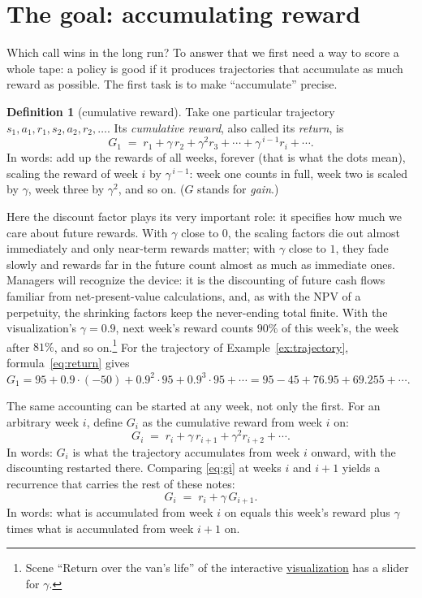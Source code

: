 \documentclass[11pt,a4paper]{article}
\theoremstyle{definition}
\newtheorem{definition}{Definition}[section]
\theoremstyle{remark}
\numberwithin{equation}{section}
\newcommand{\vizhref}[1]{\href{https://sml-fs26.github.io/classic_rl/repair-or-replace/}{#1}}
\begin{document}
\section{The goal: accumulating reward}

Which call wins in the long run? To answer that we first need a way to score a whole tape: a
policy is good if it produces trajectories that accumulate as much reward as possible. The
first task is to make ``accumulate'' precise.

\begin{definition}[cumulative reward]
Take one particular trajectory $s_1, a_1, r_1, s_2, a_2, r_2, \dots$. Its \emph{cumulative
reward}, also called its \emph{return}, is
\begin{equation}\label{eq:return}
G_1 \;=\; r_1 + \gamma\, r_2 + \gamma^2 r_3 + \cdots + \gamma^{\,i-1} r_i + \cdots.
\end{equation}
In words: add up the rewards of all weeks, forever (that is what the dots mean), scaling the
reward of week $i$ by $\gamma^{\,i-1}$: week one counts in full, week two is scaled by
$\gamma$, week three by $\gamma^2$, and so on. ($G$ stands for \emph{gain}.)
\end{definition}

Here the discount factor plays its very important role: it specifies how much we care about
future rewards. With $\gamma$ close to $0$, the scaling factors die out almost immediately
and only near-term rewards matter; with $\gamma$ close to $1$, they fade slowly and rewards
far in the future count almost as much as immediate ones. Managers will recognize the device:
it is the discounting of future cash flows familiar from net-present-value calculations, and,
as with the NPV of a perpetuity, the shrinking factors keep the never-ending total finite.
With the visualization's $\gamma = 0.9$, next week's reward counts $90\%$ of this week's, the
week after $81\%$, and so on.\footnote{Scene ``Return over the van's life'' of the
interactive \vizhref{visualization} has a slider for $\gamma$.} For the trajectory of
Example~\ref{ex:trajectory}, formula~\eqref{eq:return} gives
$G_1 = 95 + 0.9 \cdot (-50) + 0.9^2 \cdot 95 + 0.9^3 \cdot 95 + \cdots
= 95 - 45 + 76.95 + 69.255 + \cdots$.

The same accounting can be started at any week, not only the first. For an arbitrary week
$i$, define $G_i$ as the cumulative reward from week $i$ on:
\begin{equation}\label{eq:gi}
G_i \;=\; r_i + \gamma\, r_{i+1} + \gamma^2 r_{i+2} + \cdots.
\end{equation}
In words: $G_i$ is what the trajectory accumulates from week $i$ onward, with the discounting
restarted there. Comparing \eqref{eq:gi} at weeks $i$ and $i+1$ yields a recurrence that
carries the rest of these notes:
\begin{equation}\label{eq:recurrence}
G_i \;=\; r_i + \gamma\, G_{i+1}.
\end{equation}
In words: what is accumulated from week $i$ on equals this week's reward plus $\gamma$ times
what is accumulated from week $i+1$ on.
\end{document}
